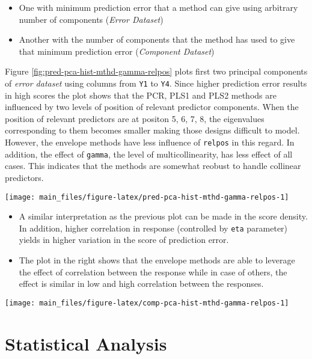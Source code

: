 \documentclass[12pt,3p,authoryear]{elsarticle}
\providecommand{\tightlist}{%
  \setlength{\itemsep}{0pt}\setlength{\parskip}{0pt}}
\begin{document}
\begin{itemize}
\tightlist
\item
  One with minimum prediction error that a method can give using
  arbitrary number of components (\emph{Error Dataset})
\item
  Another with the number of components that the method has used to give
  that minimum prediction error (\emph{Component Dataset})
\end{itemize}

Figure \ref{fig:pred-pca-hist-mthd-gamma-relpos} plots first two
principal components of \emph{error dataset} using columns from
\texttt{Y1} to \texttt{Y4}. Since higher prediction error results in
high scores the plot shows that the PCR, PLS1 and PLS2 methods are
influenced by two levels of position of relevant predictor components.
When the position of relevant predictors are at positon 5, 6, 7, 8, the
eigenvalues corresponding to them becomes smaller making those designs
difficult to model. However, the envelope methods have less influence of
\texttt{relpos} in this regard. In addition, the effect of
\texttt{gamma}, the level of multicollinearity, has less effect of all
cases. This indicates that the methods are somewhat reobust to handle
collinear predictors.

\texttt{[image: main\_files/figure-latex/pred-pca-hist-mthd-gamma-relpos-1]}

\begin{itemize}
\tightlist
\item
  A similar interpretation as the previous plot can be made in the score
  density. In addition, higher correlation in response (controlled by
  \texttt{eta} parameter) yields in higher variation in the score of
  prediction error.
\item
  The plot in the right shows that the envelope methods are able to
  leverage the effect of correlation between the response while in case
  of others, the effect is similar in low and high correlation between
  the responses.
\end{itemize}

\texttt{[image: main\_files/figure-latex/comp-pca-hist-mthd-gamma-relpos-1]}

\hypertarget{statistical-analysis}{%
\section{Statistical Analysis}\label{statistical-analysis}}
\end{document}
